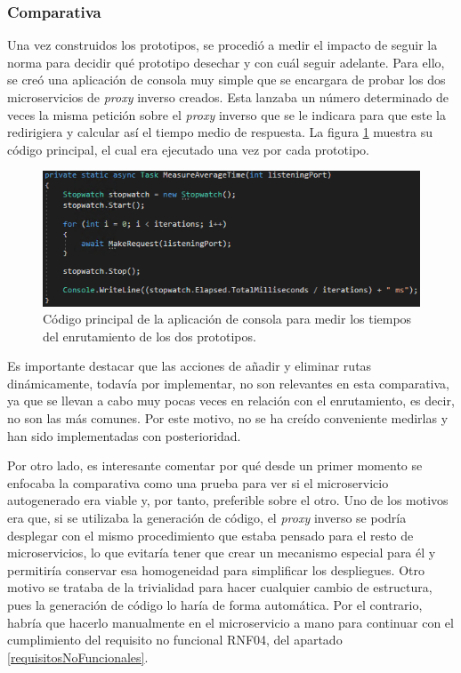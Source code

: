 \documentclass[11pt,spanish,listoffigures]{tfgetsinf}
\begin{document}
			\subsubsection{Comparativa}

Una vez construidos los prototipos, se procedió a medir el impacto de seguir la norma para decidir qué prototipo desechar y con cuál seguir adelante. Para ello, se creó una aplicación de consola muy simple que se encargara de probar los dos microservicios de \emph{proxy} inverso creados. Esta lanzaba un número determinado de veces la misma petición sobre el \emph{proxy} inverso que se le indicara para que este la redirigiera y calcular así el tiempo medio de respuesta. La figura \ref{medidorTiempos} muestra su código principal, el cual era ejecutado una vez por cada prototipo.

\begin{figure}[ht]
\centering
\includegraphics[scale=1]{imagenes/medidorTiempos}
\caption{Código principal de la aplicación de consola para medir los tiempos del enrutamiento de los dos prototipos.}
	\label{medidorTiempos}
\end{figure}

Es importante destacar que las acciones de añadir y eliminar rutas dinámicamente, todavía por implementar, no son relevantes en esta comparativa, ya que se llevan a cabo muy pocas veces en relación con el enrutamiento, es decir, no son las más comunes. Por este motivo, no se ha creído conveniente medirlas y han sido implementadas con posterioridad.

Por otro lado, es interesante comentar por qué desde un primer momento se enfocaba la comparativa como una prueba para ver si el microservicio autogenerado era viable y, por tanto, preferible sobre el otro. Uno de los motivos era que, si se utilizaba la generación de código, el \emph{proxy} inverso se podría desplegar con el mismo procedimiento que estaba pensado para el resto de microservicios, lo que evitaría tener que crear un mecanismo especial para él y permitiría conservar esa homogeneidad para simplificar los despliegues. Otro motivo se trataba de la trivialidad para hacer cualquier cambio de estructura, pues la generación de código lo haría de forma automática. Por el contrario, habría que hacerlo manualmente en el microservicio a mano para continuar con el cumplimiento del requisito no funcional RNF04, del apartado \ref{requisitosNoFuncionales}.
\end{document}

